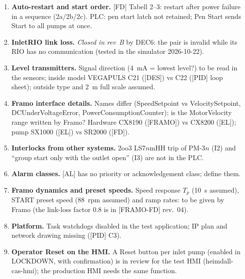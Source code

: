 \documentclass[11pt,a4paper]{article}
\begin{document}
\begin{small}
\begin{enumerate}[label=\textbf{OI\arabic*}, leftmargin=12mm, itemsep=0.5mm]
        time after , next pump when a start fails. Still open: [FD]'s warning when a
        pump has been idle too long; thresholds, delays and cycle time to be confirmed with Framo (start
        and stop wear, minimum run time); the level swing of about $\pm$1~cm during a rotation handover
        (live test 2026-10-22, register IN-31).
  \item \textbf{Auto-restart and start order.} [FD] Tabell 2--3: restart after power failure in a
        sequence (2a/2b/2c). PLC: pen start latch not retained; Pen Start sends Start to all pumps at
        once.
  \item \textbf{InletRIO link loss.} \emph{Closed in rev~B} by DEC6: the pair is invalid while its RIO
        has no communication (tested in the simulator 2026-10-22).
  \item \textbf{Level transmitters.} Signal direction (4~mA = lowest level?) to be read in the sensors;
        inside model VEGAPULS C21 ([DES]) vs C22 ([PID] loop sheet); outside type and 2~m full scale
        assumed.
  \item \textbf{Framo interface details.} Names differ (SpeedSetpoint vs VelocitySetpoint,
        DCUnderVoltageError, PowerConsumptionCounter); is the MotorVelocity range written by Framo?
        Hardware CX8190 ([FRAMO]) vs CX8200 ([EL]); pump SX1000 ([EL]) vs SR2000 ([FD]).
  \item \textbf{Interlocks from other systems.} 2oo3 LS7$n$mHH trip of PM-3$n$ (I2) and ``group start only
        with the outlet open'' (I3) are not in the PLC.
  \item \textbf{Alarm classes.} [AL] has no priority or acknowledgement class; define them.
  \item \textbf{Framo dynamics and preset speeds.} Speed response $T_p$ (10~s assumed), START preset
        speed (88~rpm assumed) and ramp rates: to be given by Framo (the link-loss factor 0.8 is in [FRAMO-FD] rev.~04).
  \item \textbf{Platform.} Task watchdogs disabled in the test application; IP plan and network
        drawing missing ([PID] C3).
  \item \textbf{Operator Reset on the HMI.} A Reset button per inlet pump (enabled in LOCKDOWN,
        with confirmation) is in review for the test HMI (heimdall-cas-hmi); the production HMI needs the
        same function.
\end{enumerate}
\end{small}
\end{document}
